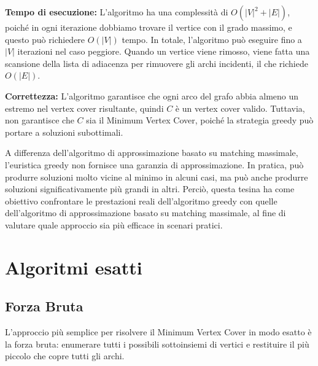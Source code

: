 \begin{algorithm}[H]
\DontPrintSemicolon
{}
\caption{Algoritmo Greedy per Vertex Cover}
\label{alg:greedy_vertex_cover}


\end{algorithm}

\textbf{Tempo di esecuzione:} L'algoritmo ha una complessità di $O(|V|^2+|E|)$, poiché in ogni iterazione dobbiamo trovare il vertice con il grado massimo, e questo può richiedere $O(|V|)$ tempo. In totale, l'algoritmo può eseguire fino a $|V|$ iterazioni nel caso peggiore. Quando un vertice viene rimosso, viene fatta una scansione della lista di adiacenza per rimuovere gli archi incidenti, il che richiede $O(|E|)$.

\textbf{Correttezza:} L'algoritmo garantisce che ogni arco del grafo abbia almeno un estremo nel vertex cover risultante, quindi $C$ è un vertex cover valido. Tuttavia, non garantisce che $C$ sia il Minimum Vertex Cover, poiché la strategia greedy può portare a soluzioni subottimali.

A differenza dell'algoritmo di approssimazione basato su matching massimale, l'euristica greedy non fornisce una garanzia di approssimazione. In pratica, può produrre soluzioni molto vicine al minimo in alcuni casi, ma può anche produrre soluzioni significativamente più grandi in altri. Perciò, questa tesina ha come obiettivo confrontare le prestazioni reali dell'algoritmo greedy con quelle dell'algoritmo di approssimazione basato su matching massimale, al fine di valutare quale approccio sia più efficace in scenari pratici.

\section{Algoritmi esatti}

\subsection{Forza Bruta} \label{brute}
L'approccio più semplice per risolvere il Minimum Vertex Cover in modo esatto è la forza bruta: enumerare tutti i possibili sottoinsiemi di vertici e restituire il più piccolo che copre tutti gli archi.

